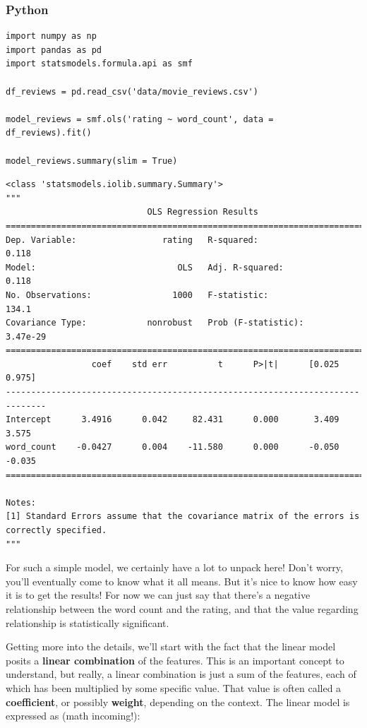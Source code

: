 \documentclass[
  letterpaper,
]{krantz}
\begin{document}
\subsubsection{Python}

\small

\begin{verbatim}
import numpy as np
import pandas as pd
import statsmodels.formula.api as smf

df_reviews = pd.read_csv('data/movie_reviews.csv')

model_reviews = smf.ols('rating ~ word_count', data = df_reviews).fit()

model_reviews.summary(slim = True)
\end{verbatim}

\begin{verbatim}
<class 'statsmodels.iolib.summary.Summary'>
"""
                            OLS Regression Results                            
==============================================================================
Dep. Variable:                 rating   R-squared:                       0.118
Model:                            OLS   Adj. R-squared:                  0.118
No. Observations:                1000   F-statistic:                     134.1
Covariance Type:            nonrobust   Prob (F-statistic):           3.47e-29
==============================================================================
                 coef    std err          t      P>|t|      [0.025      0.975]
------------------------------------------------------------------------------
Intercept      3.4916      0.042     82.431      0.000       3.409       3.575
word_count    -0.0427      0.004    -11.580      0.000      -0.050      -0.035
==============================================================================

Notes:
[1] Standard Errors assume that the covariance matrix of the errors is correctly specified.
"""
\end{verbatim}

\normalsize

For such a simple model, we certainly have a lot to unpack here! Don't
worry, you'll eventually come to know what it all means. But it's nice
to know how easy it is to get the results! For now we can just say that
there's a negative relationship between the word count and the rating,
and that the value regarding relationship is statistically significant.

Getting more into the details, we'll start with the fact that the linear
model posits a \textbf{linear combination} of the features. This is an
important concept to understand, but really, a linear combination is
just a sum of the features, each of which has been multiplied by some
specific value. That value is often called a \textbf{coefficient}, or
possibly \textbf{weight}, depending on the context. The linear model is
expressed as (math incoming!):
\end{document}
